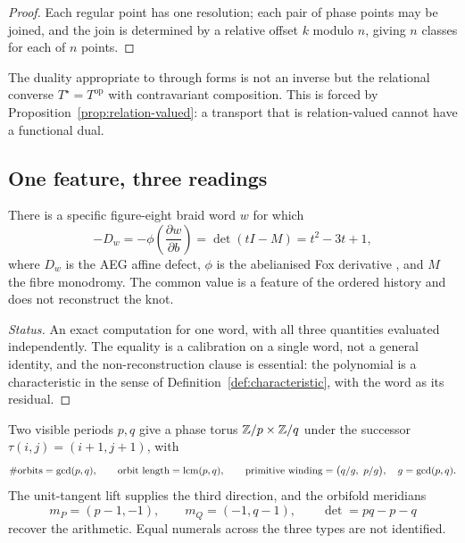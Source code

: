 \begin{proof}
Each regular point has one resolution; each pair of phase points may be joined, and the
join is determined by a relative offset $k$ modulo $n$, giving $n$ classes for each of
$n$ points.
\end{proof}

\begin{remark}
The duality appropriate to through forms is not an inverse but the relational converse
$T^{\star}=T^{\mathrm{op}}$ with contravariant composition.  This is forced by
Proposition~\ref{prop:relation-valued}: a transport that is relation-valued cannot have a
functional dual.
\end{remark}

\subsection{One feature, three readings}

\begin{theorem}\label{thm:figure-eight}
There is a specific figure-eight braid word $w$ for which
\[
  -D_w=-\phi\!\left(\frac{\partial w}{\partial b}\right)
  =\det(tI-M)=t^{2}-3t+1 ,
\]
where $D_w$ is the AEG affine defect, $\phi$ is the abelianised Fox derivative
\cite{Fox1953FreeDifferential}, and $M$ the fibre monodromy.  The common value is a
feature of the ordered history and does not reconstruct the knot.
\end{theorem}

\begin{proof}[Status]
An exact computation for one word, with all three quantities evaluated independently.
The equality is a calibration on a single word, not a general identity, and the
non-reconstruction clause is essential: the polynomial is a characteristic in the sense
of Definition~\ref{def:characteristic}, with the word as its residual.
\end{proof}

\begin{proposition}\label{prop:double-periods}
Two visible periods $p,q$ give a phase torus $\mathbb{Z}/p\times\mathbb{Z}/q$ under the successor
$\tau(i,j)=(i+1,j+1)$, with
\[
  \#\text{orbits}=\gcd(p,q),\qquad \text{orbit length}=\operatorname{lcm}(p,q),\qquad
  \text{primitive winding}=\bigl(q/g,\ p/g\bigr),\quad g=\gcd(p,q).
\]
The unit-tangent lift supplies the third direction, and the orbifold meridians
\[
  m_P=(p-1,-1),\qquad m_Q=(-1,q-1),\qquad \det = pq-p-q
\]
recover the arithmetic.  Equal numerals across the three types are not identified.
\end{proposition}

